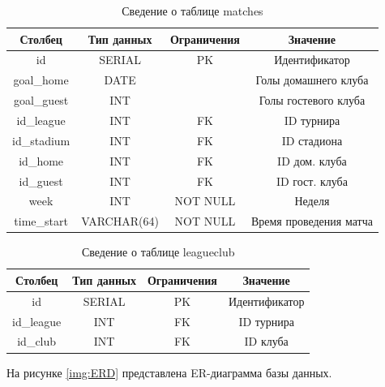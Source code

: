 \begin{table}[H]
	\begin{center}
		\caption{Сведение о таблице matches}
		\begin{tabular}{|c|c|c|c|}
			\hline
			Столбец & Тип данных & Ограничения & Значение \\
			\hline
			id & SERIAL & PK & Идентификатор \\
			\hline
			goal\_home & DATE &  & Голы домашнего клуба \\
			\hline
			goal\_guest & INT &  & Голы гостевого клуба \\
			\hline
			id\_league & INT & FK & ID турнира \\
			\hline
			id\_stadium & INT & FK & ID стадиона \\
			\hline
			id\_home & INT & FK & ID дом. клуба \\
			\hline
			id\_guest & INT & FK & ID гост. клуба \\
			\hline
			week & INT & NOT NULL & Неделя \\
			\hline
			time\_start & VARCHAR(64) & NOT NULL & Время проведения матча \\
			\hline						
		\end{tabular}
		\label{table:db:match}
	\end{center}
\end{table}

\begin{table}[H]
	\begin{center}
		\caption{Сведение о таблице leagueclub}
		\begin{tabular}{|c|c|c|c|}
			\hline
			Столбец & Тип данных & Ограничения & Значение \\
			\hline
			id & SERIAL & PK & Идентификатор \\
			\hline
			id\_league & INT & FK & ID турнира \\
			\hline
			id\_club & INT & FK & ID клуба \\
			\hline
		\end{tabular}
		\label{table:db:leagueclub}
	\end{center}
\end{table}
\clearpage
На рисунке \ref{img:ERD} представлена ER-диаграмма базы данных.

